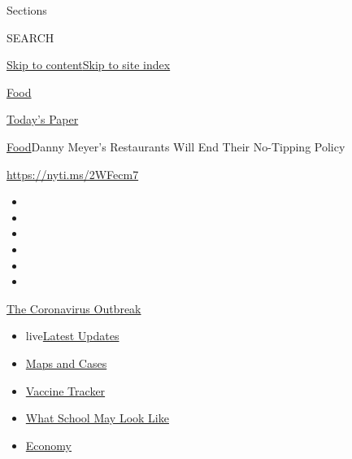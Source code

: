 Sections

SEARCH

\protect\hyperlink{site-content}{Skip to
content}\protect\hyperlink{site-index}{Skip to site index}

\href{https://www.nytimes3xbfgragh.onion/section/food}{Food}

\href{https://myaccount.nytimes3xbfgragh.onion/auth/login?response_type=cookie\&client_id=vi}{}

\href{https://www.nytimes3xbfgragh.onion/section/todayspaper}{Today's
Paper}

\href{/section/food}{Food}\textbar{}Danny Meyer's Restaurants Will End
Their No-Tipping Policy

\url{https://nyti.ms/2WFecm7}

\begin{itemize}
\item
\item
\item
\item
\item
\item
\end{itemize}

\href{https://www.nytimes3xbfgragh.onion/news-event/coronavirus?action=click\&pgtype=Article\&state=default\&region=TOP_BANNER\&context=storylines_menu}{The
Coronavirus Outbreak}

\begin{itemize}
\tightlist
\item
  live\href{https://www.nytimes3xbfgragh.onion/2020/08/01/world/coronavirus-covid-19.html?action=click\&pgtype=Article\&state=default\&region=TOP_BANNER\&context=storylines_menu}{Latest
  Updates}
\item
  \href{https://www.nytimes3xbfgragh.onion/interactive/2020/us/coronavirus-us-cases.html?action=click\&pgtype=Article\&state=default\&region=TOP_BANNER\&context=storylines_menu}{Maps
  and Cases}
\item
  \href{https://www.nytimes3xbfgragh.onion/interactive/2020/science/coronavirus-vaccine-tracker.html?action=click\&pgtype=Article\&state=default\&region=TOP_BANNER\&context=storylines_menu}{Vaccine
  Tracker}
\item
  \href{https://www.nytimes3xbfgragh.onion/interactive/2020/07/29/us/schools-reopening-coronavirus.html?action=click\&pgtype=Article\&state=default\&region=TOP_BANNER\&context=storylines_menu}{What
  School May Look Like}
\item
  \href{https://www.nytimes3xbfgragh.onion/live/2020/07/31/business/stock-market-today-coronavirus?action=click\&pgtype=Article\&state=default\&region=TOP_BANNER\&context=storylines_menu}{Economy}
\end{itemize}


